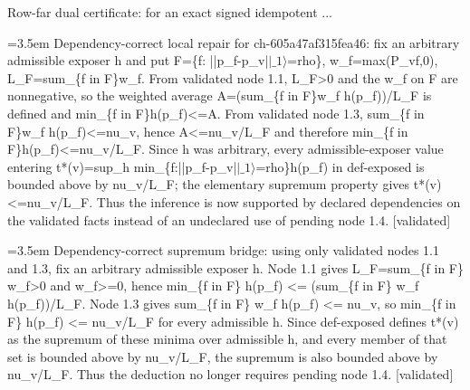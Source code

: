 \documentclass{article}
\newcommand{\step}[1]{\par\noindent\hangindent=3.5em\hangafter=1%
  \makebox[3.5em][l]{\textbf{#1.}}}
\newcommand{\steptag}[1]{\hfill{\small\textsf{[#1]}}}
\begin{document}
\begin{proofbox}{Row-far dual certificate: for an exact signed idempotent ...}
\step{1.5.1.1.1} Dependency-correct local repair for ch-605a47af315fea46: fix an arbitrary admissible exposer h and put F=\{f: ||p\_f-p\_v|$|\_1\rangle$=rho\}, w\_f=max(P\_vf,0), L\_F=sum\_\{f in F\}w\_f. From validated node 1.1, L\_F>0 and the w\_f on F are nonnegative, so the weighted average A=(sum\_\{f in F\}w\_f h(p\_f))/L\_F is defined and min\_\{f in F\}h(p\_f)<=A. From validated node 1.3, sum\_\{f in F\}w\_f h(p\_f)<=nu\_v, hence A<=nu\_v/L\_F and therefore min\_\{f in F\}h(p\_f)<=nu\_v/L\_F. Since h was arbitrary, every admissible-exposer value entering t*(v)=sup\_h min\_\{f:||p\_f-p\_v|$|\_1\rangle$=rho\}h(p\_f) in def-exposed is bounded above by nu\_v/L\_F; the elementary supremum property gives t*(v)<=nu\_v/L\_F. Thus the inference is now supported by declared dependencies on the validated facts instead of an undeclared use of pending node 1.4. \steptag{validated} \\[4pt]
\step{1.5.1.2} Dependency-correct supremum bridge: using only validated nodes 1.1 and 1.3, fix an arbitrary admissible exposer h. Node 1.1 gives L\_F=sum\_\{f in F\} w\_f>0 and w\_f>=0, hence min\_\{f in F\} h(p\_f) <= (sum\_\{f in F\} w\_f h(p\_f))/L\_F. Node 1.3 gives sum\_\{f in F\} w\_f h(p\_f) <= nu\_v, so min\_\{f in F\} h(p\_f) <= nu\_v/L\_F for every admissible h. Since def-exposed defines t*(v) as the supremum of these minima over admissible h, and every member of that set is bounded above by nu\_v/L\_F, the supremum is also bounded above by nu\_v/L\_F. Thus the deduction no longer requires pending node 1.4. \steptag{validated} \\[4pt]
\end{proofbox}
\end{document}
